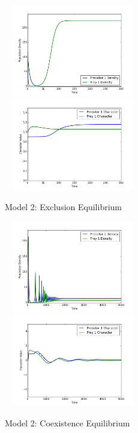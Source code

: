 \documentclass{amsart}
\theoremstyle{definition}
\theoremstyle{remark}
\numberwithin{equation}{section}
\begin{document}
\begin{centering}
	\begin{figure}
		\includegraphics[width=6cm,height=4cm]{figures/1x1/variable_growth/stable_exclusion/densities.png}
		\includegraphics[width=6cm,height=4cm]{figures/1x1/variable_growth/stable_exclusion/traits.png}
		\caption{Model 2: Exclusion Equilibrium}
		\label{fig:variable_growth_exclusion}
	\end{figure}
	\begin{figure}
		\includegraphics[width=6cm,height=4cm]{figures/1x1/variable_growth/stable_coexistence/densities.png}
		\includegraphics[width=6cm,height=4cm]{figures/1x1/variable_growth/stable_coexistence/traits.png}
		\caption{Model 2: Coexistence Equilibrium}
		\label{fig:variable_growth_coexistence_equilibrium}
	\end{figure}
	\begin{figure}

\end{figure}
\end{centering}
\end{document}
